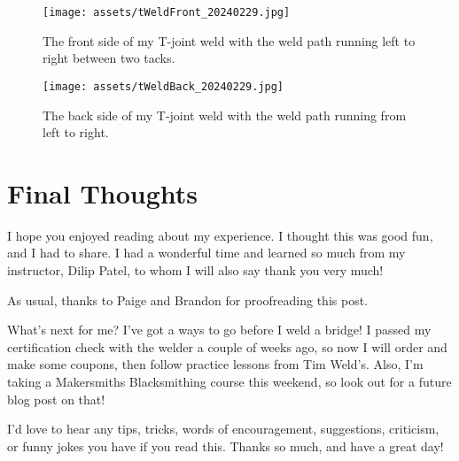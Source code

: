 \documentclass{article}
\begin{document}
\begin{figure}[h]
\caption{The front side of my T-joint weld with the weld path running left to right between two tacks.}
\texttt{[image: assets/tWeldFront\_20240229.jpg]}
\label{tJoint1}
\end{figure}

\begin{figure}[h]
\caption{The back side of my T-joint weld with the weld path running from left to right.}
\texttt{[image: assets/tWeldBack\_20240229.jpg]}
\label{tJoint2}
\end{figure}

\section*{Final Thoughts}

I hope you enjoyed reading about my experience. I thought this was good fun, and I had to share. I had a wonderful time and learned so much from my instructor, Dilip Patel, to whom I will also say thank you very much!

As usual, thanks to Paige and Brandon for proofreading this post.

What's next for me? I've got a ways to go before I weld a bridge! I passed my certification check with the welder a couple of weeks ago, so now I will order and make some coupons, then follow practice lessons from Tim Weld's. Also, I'm taking a Makersmiths Blacksmithing course this weekend, so look out for a future blog post on that!

I'd love to hear any tips, tricks, words of encouragement, suggestions, criticism, or funny jokes you have if you read this. Thanks so much, and have a great day!
\end{document}
